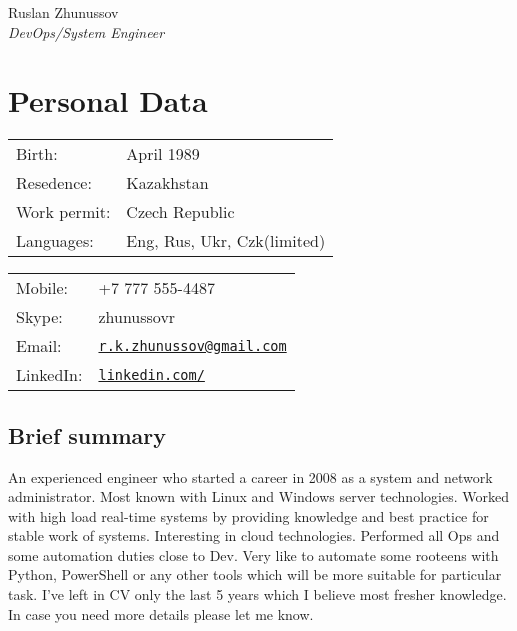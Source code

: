 \documentclass[a4paper,10pt]{article}
\def\name{Ruslan Zhunussov}
\begin{document}
{\huge \name \\}
\textit{DevOps/System Engineer}

\section*{Personal Data}
\begin{minipage}{0.45\linewidth}
    \begin{tabular}{ll}
        Birth: &  April 1989\\
        Resedence: &  Kazakhstan \\
        Work permit: & Czech Republic \\
        Languages: & Eng, Rus, Ukr, Czk(limited) \\
      \end{tabular}
\end{minipage}
\begin{minipage}{0.45\linewidth}
    \begin{tabular}{ll}
      Mobile: & +7 777 555-4487 \\
      Skype: &  zhunussovr \\
      Email: & \href{mailto:r.k.zhunussov@gmail.com}{\tt r.k.zhunussov@gmail.com} \\
      LinkedIn: & \href{https://www.linkedin.com/in/ruslan-zhunussov-6b575a5a}{\tt linkedin.com/} \\
    \end{tabular}
\end{minipage}

\subsection*{Brief summary}
\textnormal{An experienced engineer who started a career in 2008 as a system and network administrator.  
Most known with Linux and Windows server technologies. Worked with high load real-time systems by providing 
knowledge and best practice for stable work of systems.  Interesting in cloud technologies.  
Performed all Ops and some automation duties close to Dev. Very like to automate some rooteens with Python, 
PowerShell or any other tools which will be more suitable for particular task.
I've left in CV only the last 5 years which I believe most fresher knowledge. 
In case you need more details please let me know.}
\end{document}
